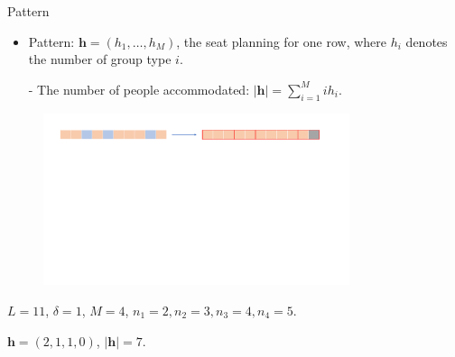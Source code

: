   \begin{frame}{Pattern}
    \begin{itemize}
      \item Pattern: $\bm{h} = (h_1, \ldots, h_M)$, the seat planning for one row, where $h_i$ denotes the number of group type $i$.

      - The number of people accommodated: $|\bm{h}| = \sum_{i =1}^{M} i h_i$.
    \end{itemize}
    
    \begin{figure}[ht]
      \centering
      \includegraphics[width = 0.8\textwidth]{./images/dummy_seat.pdf}
    \end{figure}
    \centering
    $L = 11$, $\delta =1$, $M =4$, $n_1 = 2, n_2 = 3, n_3 = 4, n_4 = 5$. 

    $\bm{h} = (2, 1, 1, 0)$, $|\bm{h}| = 7$.
  \end{frame}

